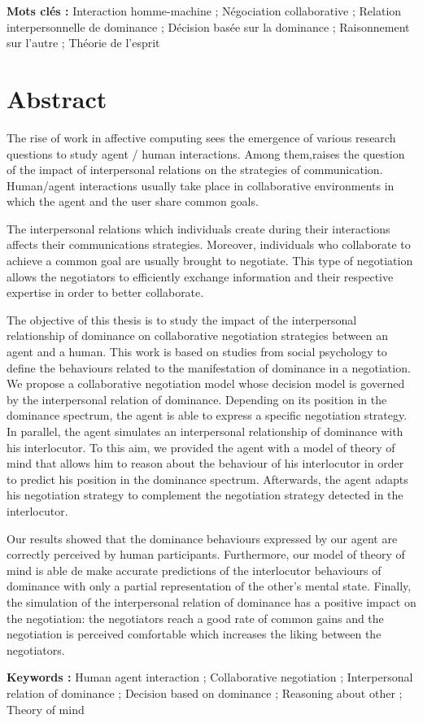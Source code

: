 \begin{otherlanguage}{french}
\vspace{2em}
\par \textbf{Mots clés :} Interaction homme-machine ; Négociation collaborative ; Relation interpersonnelle de dominance ; Décision basée sur la dominance ; Raisonnement sur l'autre ; Théorie de l'esprit
\end{otherlanguage}


\vfill
\clearpage
\chapter*{Abstract}

The rise of work in affective computing sees the emergence of various research questions to study agent / human interactions. Among them,raises the question of the impact of interpersonal relations on the strategies of communication.
Human/agent interactions usually take place in collaborative environments in which the agent and the user share common goals.

The interpersonal relations which individuals create during their interactions affects their communications strategies. Moreover, individuals who collaborate to achieve a common goal are usually brought to negotiate. This type of negotiation allows the negotiators to efficiently exchange information and their respective expertise in order to better collaborate.

The objective of this thesis is to study the impact of the interpersonal relationship of dominance on collaborative negotiation strategies between an agent and a human.
This work is based on studies from social psychology to define the behaviours related to the manifestation of dominance in a negotiation.
We propose a collaborative negotiation model whose decision model is governed by the interpersonal relation of dominance.
Depending on its position in the dominance spectrum, the agent is able to express a specific negotiation strategy.
In parallel, the agent simulates an interpersonal relationship of dominance with his interlocutor. To this aim, we provided the agent with a model of theory of mind that allows him to reason about the behaviour of his interlocutor in order to predict his position in the dominance spectrum. Afterwards, the agent adapts his negotiation strategy to complement the negotiation strategy detected in the interlocutor.

Our results showed that the dominance behaviours expressed by our agent are correctly perceived by human participants. Furthermore, our model of theory of mind is able de make accurate predictions of the interlocutor behaviours of dominance with only a partial representation of the other's mental state.
Finally, the simulation of the interpersonal relation of dominance has a positive impact on the negotiation: the negotiators reach a good rate of common gains and the negotiation is perceived comfortable which increases the liking between the negotiators.

\vspace{2em}
\par \textbf{Keywords :} Human agent interaction ; Collaborative negotiation ; Interpersonal relation of dominance ; Decision based on dominance ; Reasoning about other ; Theory of mind

